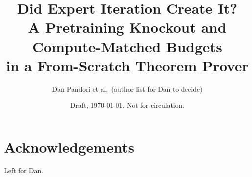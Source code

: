 \documentclass[11pt]{article}
\title{Did Expert Iteration Create It?\\[0.3em]\large A Pretraining Knockout and Compute-Matched Budgets\\in a From-Scratch Theorem Prover}
\author{Dan Pandori et al.\ (author list for Dan to decide)}
\date{Draft, \today. Not for circulation.}
\begin{document}
\maketitle

\begin{abstract}

\end{abstract}










\section*{Acknowledgements}
Left for Dan.




\appendix

\end{document}
